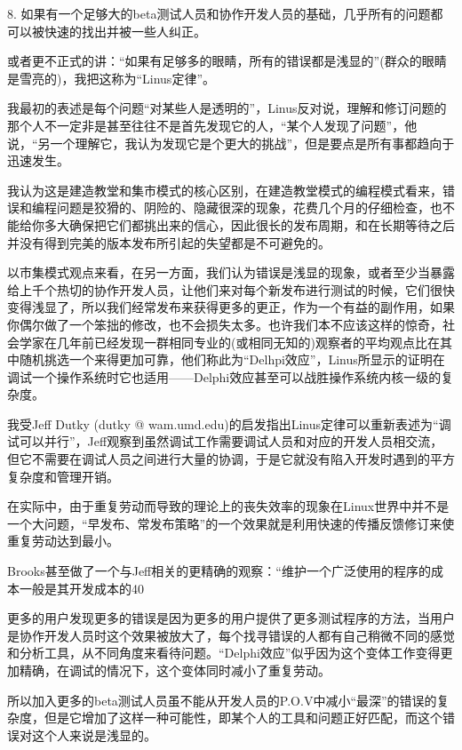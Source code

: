 \documentclass[a4paper,12pt,UTF8,twoside]{ctexbook}
\begin{document}
8. 如果有一个足够大的beta测试人员和协作开发人员的基础，几乎所有的问题都可以被快速的找出并被一些人纠正。


或者更不正式的讲：“如果有足够多的眼睛，所有的错误都是浅显的”(群众的眼睛是雪亮的)，我把这称为“Linus定律”。


我最初的表述是每个问题“对某些人是透明的”，Linus反对说，理解和修订问题的那个人不一定非是甚至往往不是首先发现它的人，“某个人发现了问题”，他说，“另一个理解它，我认为发现它是个更大的挑战”，但是要点是所有事都趋向于迅速发生。


我认为这是建造教堂和集市模式的核心区别，在建造教堂模式的编程模式看来，错误和编程问题是狡猾的、阴险的、隐藏很深的现象，花费几个月的仔细检查，也不能给你多大确保把它们都挑出来的信心，因此很长的发布周期，和在长期等待之后并没有得到完美的版本发布所引起的失望都是不可避免的。


以市集模式观点来看，在另一方面，我们认为错误是浅显的现象，或者至少当暴露给上千个热切的协作开发人员，让他们来对每个新发布进行测试的时候，它们很快变得浅显了，所以我们经常发布来获得更多的更正，作为一个有益的副作用，如果你偶尔做了一个笨拙的修改，也不会损失太多。也许我们本不应该这样的惊奇，社会学家在几年前已经发现一群相同专业的(或相同无知的)观察者的平均观点比在其中随机挑选一个来得更加可靠，他们称此为“Delhpi效应”，Linus所显示的证明在调试一个操作系统时它也适用——Delphi效应甚至可以战胜操作系统内核一级的复杂度。


我受Jeff Dutky (dutky @ wam.umd.edu)的启发指出Linus定律可以重新表述为“调试可以并行”，Jeff观察到虽然调试工作需要调试人员和对应的开发人员相交流，但它不需要在调试人员之间进行大量的协调，于是它就没有陷入开发时遇到的平方复杂度和管理开销。

在实际中，由于重复劳动而导致的理论上的丧失效率的现象在Linux世界中并不是一个大问题，“早发布、常发布策略”的一个效果就是利用快速的传播反馈修订来使重复劳动达到最小。


Brooks甚至做了一个与Jeff相关的更精确的观察：“维护一个广泛使用的程序的成本一般是其开发成本的40%

更多的用户发现更多的错误是因为更多的用户提供了更多测试程序的方法，当用户是协作开发人员时这个效果被放大了，每个找寻错误的人都有自己稍微不同的感觉和分析工具，从不同角度来看待问题。“Delphi效应”似乎因为这个变体工作变得更加精确，在调试的情况下，这个变体同时减小了重复劳动。


所以加入更多的beta测试人员虽不能从开发人员的P.O.V中减小“最深”的错误的复杂度，但是它增加了这样一种可能性，即某个人的工具和问题正好匹配，而这个错误对这个人来说是浅显的。
\end{document}
